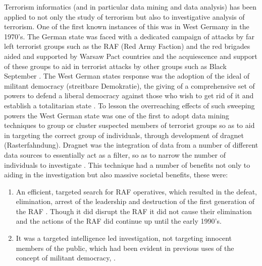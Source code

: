 Terrorism informatics (and in particular data mining and data analysis) has been applied to not only the study of terrorism but also to investigative analysis of terrorism. One of the first known instances of this was in West Germany in the 1970's. The German state was faced with a dedicated campaign of attacks by far left terrorist groups such as the RAF (Red Army Faction) and the red brigades aided and supported by Warsaw Pact countries \citep{leighton2014strange} and the acquiescence and support of these groups to aid in terrorist attacks by other groups such as Black September
\citep{nacos2016terrorism}. The West German states response was the adoption of the ideal of militant democracy (streitbare Demokratie), the giving of a comprehensive set of powers to defend a liberal democracy against those who wish to get rid of it and establish a totalitarian state \citep{rosenfeld2014militant}. To lesson the overreaching effects of such sweeping powers the West German state was one of the first to adopt data mining techniques to group or cluster suspected members of terrorist groups so as to aid in targeting the correct group of individuals, through development of dragnet (Rasterfahndung). Dragnet was the integration of data from a number of different data sources to essentially act as  a filter, so as to narrow the number of individuals to investigate \citep{weinhauer2014terror}. This technique had a number of benefits not only to aiding in the investigation but also massive societal benefits, these were:
\begin{enumerate}
\item An efficient, targeted search for RAF operatives, which resulted in the defeat, elimination, arrest of the leadership \citep{hauser1997baader} and destruction of the first generation of the RAF \citep{weinhauer2006terrorismus}. Though it did disrupt the RAF it did not cause their elimination and the actions of the RAF did continue up until the early 1990's.
\item It was a targeted intelligence led investigation, not targeting innocent members of the public, which had been evident in previous uses of the concept of militant democracy, \citep{de2010counter}.
\end{enumerate}

